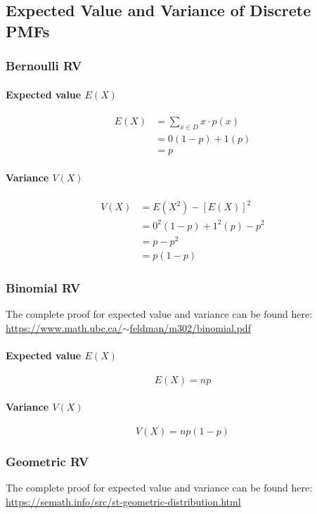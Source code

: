 \documentclass[a4paper]{article}
\begin{document}
\subsection{Expected Value and Variance of Discrete PMFs}
\subsubsection{Bernoulli RV}
\paragraph{Expected value $E(X)$}
\begin{align*}
    E(X) &= \sum_{x\in D}x\cdot p(x)\\
    &= 0(1-p)+1(p)\\
    &= p
\end{align*}
\paragraph{Variance $V(X)$}
\begin{align*}
    V(X) &= E(X^2)-[E(X)]^2\\
    &= 0^2(1-p)+1^2(p)-p^2\\
    &= p-p^2\\
    &= p(1-p)
\end{align*}
\subsubsection{Binomial RV}
The complete proof for expected value and variance can be found here:\\ \href{https://www.math.ubc.ca/~feldman/m302/binomial.pdf}{https://www.math.ubc.ca/$\sim$feldman/m302/binomial.pdf}
\paragraph{Expected value $E(X)$}
$$E(X) = np$$
\paragraph{Variance $V(X)$}
$$V(X) = np(1-p)$$
\subsubsection{Geometric RV}
The complete proof for expected value and variance can be found here:\\
\href{https://semath.info/src/st-geometric-distribution.html}{https://semath.info/src/st-geometric-distribution.html}
\end{document}
